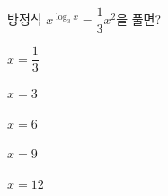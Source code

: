 방정식 $x^{\log_3 x}=\dfrac{1}{3}x^2$을 풀면?
\begin{choices32}{\rule[-3ex]{0pt}{8ex}$x=\dfrac{1}{3}$}{\rule[-3ex]{0pt}{8ex}$x=3$}{\rule[-3ex]{0pt}{8ex}$x=6$}{\rule[-3ex]{0pt}{8ex}$x=9$}{\rule[-3ex]{0pt}{8ex}$x=12$}\end{choices32}
